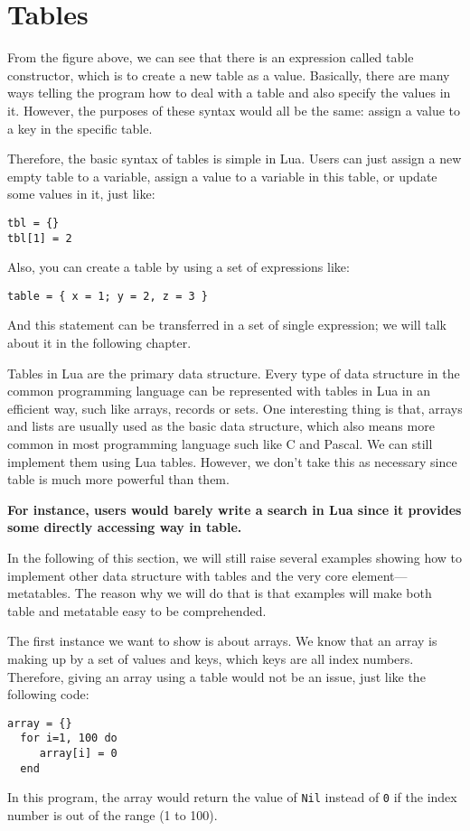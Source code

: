 \section{Tables}
From the figure above, we can see that there is an expression called table constructor, which is to create a new table as a value. Basically, there are many ways telling the program how to deal with a table and also specify the values in it. However, the purposes of these syntax would all be the same: assign a value to a key in the specific table.

Therefore, the basic syntax of tables is simple in Lua. Users can just assign a new empty table to a variable, assign a value to a variable in this table, or update some values in it, just like:
\begin{flushleft}
\tt tbl = \{\} \\
\tt tbl[1] = 2 \\
\end{flushleft}
Also, you can create a table by using a set of expressions like:
\begin{flushleft}
\tt table = \{ x = 1; y = 2, z = 3 \} \\
\end{flushleft}
And this statement can be transferred in a set of single expression; we will talk about it in the following chapter.

Tables in Lua are the primary data structure. Every type of data structure in the common programming language can be represented with tables in Lua in an efficient way, such like arrays, records or sets. One interesting thing is that, arrays and lists are usually used as the basic data structure, which also means more common in most programming language such like C and Pascal. We can still implement them using Lua tables. However, we don't take this as necessary since table is much more powerful than them. 

{\bf For instance, users would barely write a search in Lua since it provides some directly accessing way in table.}

In the following of this section, we will still raise several examples showing how to implement other data structure with tables and the very core element---metatables. The reason why we will do that is that examples will make both table and metatable easy to be comprehended.

The first instance we want to show is about arrays. We know that an array is making up by a set of values and keys, which keys are all index numbers. Therefore, giving an array using a table would not be an issue, just like the following code:
\begin{flushleft}
\tt array = \{\} \\
\tt ~~for i=1, 100 do\\
\tt ~~~~ array[i] = 0\\
\tt ~~end\\
\end{flushleft}
In this program, the array would return the value of {\tt Nil} instead of {\tt 0} if the index number is out of the range (1 to 100).

